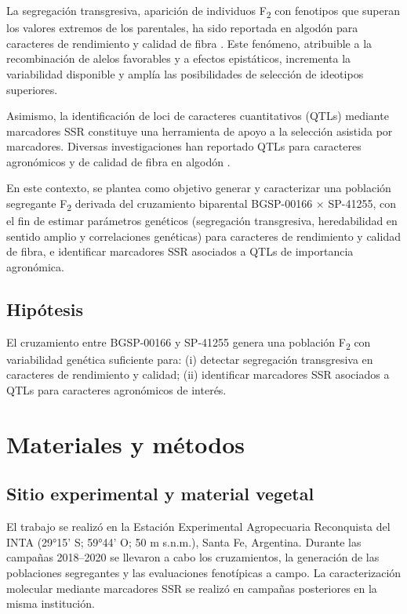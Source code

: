 \documentclass[12pt,oneside]{reedthesis}
\begin{document}
La segregación transgresiva, aparición de individuos F\textsubscript{2} con fenotipos que superan los valores extremos de los parentales, ha sido reportada en algodón para caracteres de rendimiento y calidad de fibra \autocite{khan2005,nidagundi2023}. Este fenómeno, atribuible a la recombinación de alelos favorables y a efectos epistáticos, incrementa la variabilidad disponible y amplía las posibilidades de selección de ideotipos superiores.

Asimismo, la identificación de loci de caracteres cuantitativos (QTLs) mediante marcadores SSR constituye una herramienta de apoyo a la selección asistida por marcadores. Diversas investigaciones han reportado QTLs para caracteres agronómicos y de calidad de fibra en algodón \autocite{zhang2005,shen2007,wang2007,wang2014,xia2014,liu2012,qin2015,shi2015,su2016,zhang2016,ademe2017,liu2017,iqbal2017,li2017,baytar2018,liu2018}.

En este contexto, se plantea como objetivo generar y caracterizar una población segregante F\textsubscript{2} derivada del cruzamiento biparental BGSP-00166 × SP-41255, con el fin de estimar parámetros genéticos (segregación transgresiva, heredabilidad en sentido amplio y correlaciones genéticas) para caracteres de rendimiento y calidad de fibra, e identificar marcadores SSR asociados a QTLs de importancia agronómica.

\subsection{Hipótesis}\label{hipuxf3tesis-1}

El cruzamiento entre BGSP-00166 y SP-41255 genera una población F\textsubscript{2} con variabilidad genética suficiente para: (i) detectar segregación transgresiva en caracteres de rendimiento y calidad; (ii) identificar marcadores SSR asociados a QTLs para caracteres agronómicos de interés.

\section{Materiales y métodos}\label{materiales-y-muxe9todos-1}

\subsection{Sitio experimental y material vegetal}\label{sitio-experimental-y-material-vegetal-1}

El trabajo se realizó en la Estación Experimental Agropecuaria Reconquista del INTA (29°15' S; 59°44' O; 50 m s.n.m.), Santa Fe, Argentina. Durante las campañas 2018--2020 se llevaron a cabo los cruzamientos, la generación de las poblaciones segregantes y las evaluaciones fenotípicas a campo. La caracterización molecular mediante marcadores SSR se realizó en campañas posteriores en la misma institución.
\end{document}
